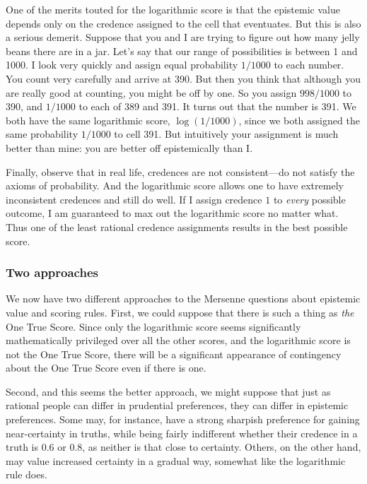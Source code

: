 One of the merits touted for the logarithmic score is that the epistemic value depends only on the credence assigned 
to the cell that eventuates.  But this is also
a serious demerit. Suppose that you and I are trying to figure out how many jelly beans there are in a jar. Let's say that our range of
possibilities is between 1 and 1000. I look very quickly and assign equal probability $1/1000$ to each number. You count very carefully
and arrive at 390. But then you think that although you are really good at counting, you might be off by one. So you assign $998/1000$
to 390, and $1/1000$ to each of 389 and 391. It turns out that the number is 391. We both have the same logarithmic score, $\log (1/1000)$,
since we both assigned the same probability $1/1000$ to cell 391. But intuitively your assignment is much better than mine: you are better
off epistemically than I.

Finally, observe that in real life, credences are not consistent---do not satisfy the axioms of probability. And the logarithmic score
allows one to have extremely inconsistent credences and still do well. If I assign credence $1$ to \textit{every} possible outcome, I am
guaranteed to max out the logarithmic score no matter what. Thus one of the least rational credence assignments results in the best
possible score.

\subsubsection{Two approaches}
We now have two different approaches to the Mersenne questions about epistemic value and scoring rules. First, we could suppose that there
is such a thing as \textit{the} One True Score. Since only the logarithmic score seems significantly mathematically privileged over all
the other scores, and the logarithmic score is not the One True Score, there will be a significant appearance of contingency about the
One True Score even if there is one.

Second, and this seems the better approach, we might suppose that just as rational people can differ in prudential preferences, they can differ in epistemic preferences. 
Some may, for instance, have a strong sharpish preference for gaining near-certainty in truths, while being fairly indifferent whether their
credence in a truth is $0.6$ or $0.8$, as neither is that close to certainty. Others, on the other hand, may value increased certainty in
a gradual way, somewhat like the logarithmic rule does. 


